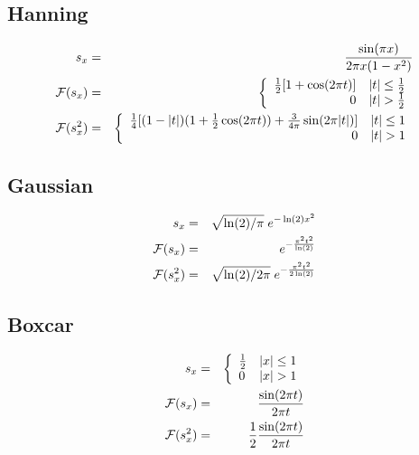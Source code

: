 \documentclass[12pt]{article}
\begin{document}
\subsection{Hanning}

\begin{eqnarray}
s_{x} &=& \frac{\sin(\pi x)} {2\pi x(1-x^2)}\\
{\cal F}(s_{x}) &=& \left\{
              \begin{array}{rl} \frac{1}{2}[1 + \cos(2\pi t)] & |t| \le \frac{1}{2}\\
                                                            0 & |t|   > \frac{1}{2}\\
              \end{array}
        \right.\\
{\cal F}(s_{x}^2) &=&  \left\{
              \begin{array}{rl} \frac{1}{4}[(1 - |t|)(1+\frac{1}{2}\cos(2\pi t)) + \frac{3}{4\pi}\sin(2\pi|t|)] & |t| \le 1\\
                                                            0 & |t|   > 1\\
              \end{array}
        \right.
\end{eqnarray}

\subsection{Gaussian}

\begin{eqnarray}
s_{x} &=& \sqrt{\ln(2)/\pi} \; e^{-\ln(2) x^{2}}\\
{\cal F}(s_{x}) &=& e^{-\frac{\pi^2 t^2}{\ln(2)}}\\
{\cal F}(s_{x}^2) &=& \sqrt{\ln(2)/2\pi} \; e^{-\frac{\pi^2 t^2}{2 \ln(2)}}
\end{eqnarray}

\subsection{Boxcar}

\begin{eqnarray}
s_{x} &=& \left\{
              \begin{array}{ll} \frac{1}{2} & |x| \le 1\\
                                          0 & |x|   > 1\\
              \end{array}
        \right.\\
{\cal F}(s_{x}) &=& \frac{\sin(2\pi t)}{2\pi t}\\
{\cal F}(s_{x}^2) &=& \frac{1}{2} \frac{\sin(2\pi t)}{2\pi t}
\end{eqnarray}
\end{document}
